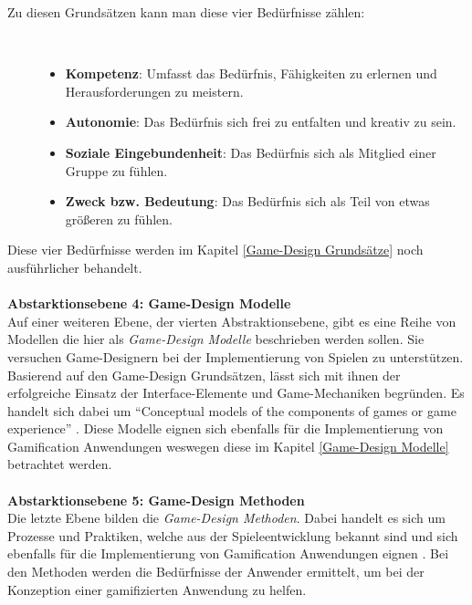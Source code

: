 \documentclass[a4paper,12pt,twoside]{scrartcl}
\begin{document}
\begin{description}
   \item[Zu diesen Grundsätzen kann man diese vier Bedürfnisse zählen:]~\par
   \begin{itemize}
      \item \textbf{Kompetenz}: Umfasst das Bedürfnis, Fähigkeiten zu erlernen und Herausforderungen zu meistern. 
      \item \textbf{Autonomie}: Das Bedürfnis sich frei zu entfalten und kreativ zu sein.
      \item \textbf{Soziale Eingebundenheit}: Das Bedürfnis sich als Mitglied einer Gruppe zu fühlen.
      \item \textbf{Zweck bzw. Bedeutung}: Das Bedürfnis sich als Teil von etwas größeren zu fühlen.
   \end{itemize}
\end{description}
Diese vier Bedürfnisse werden im Kapitel \ref{Game-Design Grundsätze} noch ausführlicher behandelt.
\\\\
\textbf{Abstarktionsebene 4: Game-Design Modelle}
\\
Auf einer weiteren Ebene, der vierten Abstraktionsebene, gibt es eine Reihe von Modellen die hier als \textit{Game-Design Modelle} beschrieben werden sollen. Sie versuchen Game-Designern bei der Implementierung von Spielen zu unterstützen. Basierend auf den Game-Design Grundsätzen, lässt sich mit ihnen der erfolgreiche Einsatz der Interface-Elemente und Game-Mechaniken begründen. Es handelt sich dabei um \enquote{Conceptual models of the components of games or game experience} \cite{Deterding2011}. Diese Modelle eignen sich ebenfalls für die Implementierung von Gamification Anwendungen weswegen diese im Kapitel \ref{Game-Design Modelle} betrachtet werden.
\\\\
\textbf{Abstarktionsebene 5: Game-Design Methoden}\\
Die letzte Ebene bilden die \textit{Game-Design Methoden}. Dabei handelt es sich um Prozesse und Praktiken, welche aus der Spieleentwicklung bekannt sind und sich ebenfalls für die Implementierung von Gamification Anwendungen eignen \cite{GameElemente2018}. Bei den Methoden werden die Bedürfnisse der Anwender ermittelt, um bei der Konzeption einer gamifizierten Anwendung zu helfen. 
\\
\end{document}

